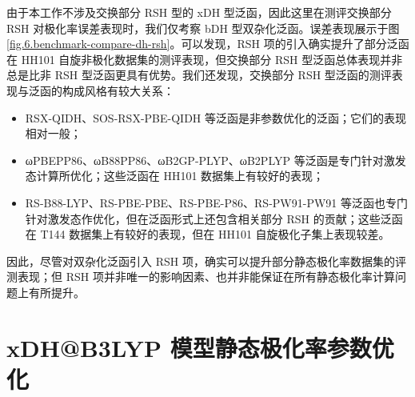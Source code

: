 由于本工作不涉及交换部分 RSH 型的 xDH 型泛函，因此这里在测评交换部分 RSH 对极化率误差表现时，我们仅考察 bDH 型双杂化泛函。误差表现展示于图 \ref{fig.6.benchmark-compare-dh-rsh}。可以发现，RSH 项的引入确实提升了部分泛函在 HH101 自旋非极化数据集的测评表现，但交换部分 RSH 型泛函总体表现并非总是比非 RSH 型泛函更具有优势。我们还发现，交换部分 RSH 型泛函的测评表现与泛函的构成风格有较大关系：
\begin{itemize}[nosep]
    \item RSX-QIDH、SOS-RSX-PBE-QIDH 等泛函是非参数优化的泛函；它们的表现相对一般；
    \item ωPBEPP86、ωB88PP86、ωB2GP-PLYP、ωB2PLYP 等泛函是专门针对激发态计算所优化；这些泛函在 HH101 数据集上有较好的表现；
    \item RS-B88-LYP、RS-PBE-PBE、RS-PBE-P86、RS-PW91-PW91 等泛函也专门针对激发态作优化，但在泛函形式上还包含相关部分 RSH 的贡献；这些泛函在 T144 数据集上有较好的表现，但在 HH101 自旋极化子集上表现较差。
\end{itemize}
因此，尽管对双杂化泛函引入 RSH 项，确实可以提升部分静态极化率数据集的评测表现；但 RSH 项并非唯一的影响因素、也并非能保证在所有静态极化率计算问题上有所提升。

\section{xDH@B3LYP 模型静态极化率参数优化}
\label{sec.6.pol-xdh-optimize}

